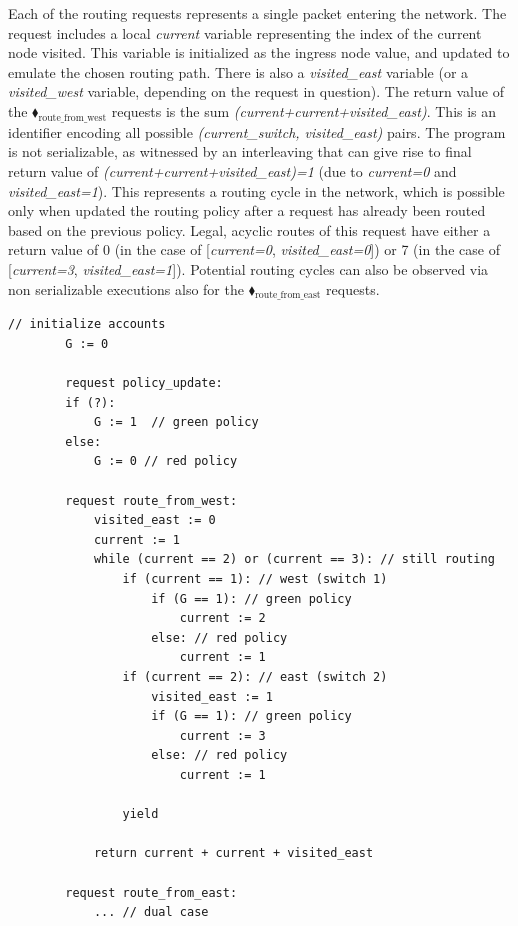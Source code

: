 Each of the routing requests represents a single packet entering the network. The request includes a local \textit{current} variable representing the index of the current node visited. This variable is initialized as the ingress node value, and updated to emulate the chosen routing path. There is also a \textit{visited\_east} variable (or a \textit{visited\_west} variable, depending on the request in question).
%
The return value of the {\color{ForestGreen}$\blacklozenge_\text{route\_from\_west}$} requests is the sum \textit{(current+current+visited\_east)}. This is an identifier encoding all possible \textit{(current\_switch, visited\_east)} pairs.
%
The program is not serializable, as witnessed by an interleaving that can give rise to final return value of \textit{(current+current+visited\_east)=1} (due to \textit{current=0} and \textit{visited\_east=1}). This represents a routing cycle in the network, which is possible only when updated the routing policy after a request has already been routed based on the previous policy.
Legal, acyclic routes of this request have either a return value of 0 (in the case of [\textit{current=0}, \textit{visited\_east=0}]) or 7 (in the case of [\textit{current=3}, \textit{visited\_east=1}]).
Potential routing cycles can also be observed via non serializable executions also for the  {\color{ForestGreen}$\blacklozenge_\text{route\_from\_east}$} requests.



\begin{minipage}[t]{1.0\textwidth}
	\begin{lstlisting}[caption={BGP (non serializable --- cycles can appear)},label={lst:BgpNonSerializable}]
	    // initialize accounts
	    G := 0
	    
	    request policy_update:
	    if (?):
	        G := 1  // green policy 
	    else:
	        G := 0 // red policy
			
	    request route_from_west:
	        visited_east := 0
	        current := 1
	        while (current == 2) or (current == 3): // still routing        
	            if (current == 1): // west (switch 1)
	                if (G == 1): // green policy
	                    current := 2
	                else: // red policy
	                    current := 1
	            if (current == 2): // east (switch 2)
	                visited_east := 1
	                if (G == 1): // green policy
	                    current := 3
	                else: // red policy
	                    current := 1
	 
	            yield
			
	        return current + current + visited_east
	        
	    request route_from_east:
	        ... // dual case     		        
		\end{lstlisting}
\end{minipage}






